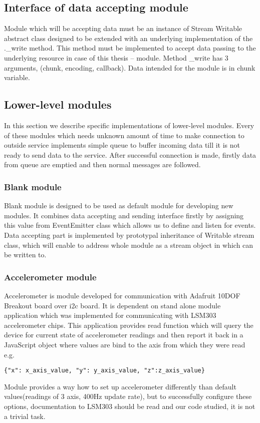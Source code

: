 \subsection{Interface of data accepting module} %
\label{ssub:interface_of_data_accepting_module}
Module which will be accepting data must be an instance of Stream Writable abstract class designed to be extended with an underlying implementation of the .\_write method. This method must be implemented to accept data passing to the underlying resource in case of this thesis -- module. Method \_write  has 3 arguments, (chunk, encoding, callback). Data intended for the module is in chunk variable.
\subsection{Lower-level modules} %
\label{sub:lower_level_modules}
In this section we describe specific implementations of lower-level modules. Every of these modules which needs unknown amount of time to make connection to outside service implements simple queue to buffer incoming data till it is not ready to send data to the service. After successful connection is made, firstly data from queue are emptied and then normal messages are followed.
\subsubsection{Blank module} %
\label{ssub:blank_module}
Blank module is designed to be used as default module for developing new modules. It combines data accepting and sending interface firstly by assigning this value from EventEmitter class which allows us to define and listen for events. Data accepting part is implemented by prototypal inheritance of Writable stream class, which will enable to address whole module as a stream object in which can be written to.
\subsubsection{Accelerometer module} %
\label{ssub:accelerometer_module}
Accelerometer is module developed for communication with Adafruit 10DOF Breakout board over \gls{i2c} board. It is dependent on stand alone module application which was implemented for communicating with LSM303 accelerometer chips. This application provides read function which will query the device for current state of accelerometer readings and then report it back in a JavaScript object where values are bind to the axis from which they were read e.g.
\begin{verbatim}{"x": x_axis_value, "y": y_axis_value, "z":z_axis_value}\end{verbatim}
Module provides a way how to set up accelerometer differently than default values(readings of 3 axis, 400Hz update rate), but to successfully configure these options, documentation to LSM303 should be read and our code studied, it is not a trivial task.

